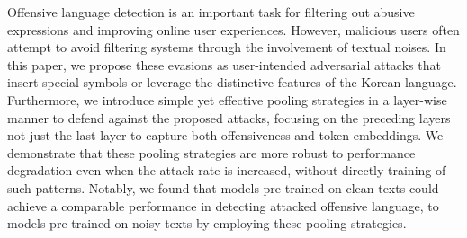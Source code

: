 Offensive language detection is an important task for filtering out abusive expressions and improving online user experiences. However, malicious users often attempt to avoid filtering systems through the involvement of textual noises. In this paper, we propose these evasions as user-intended adversarial attacks that insert special symbols or leverage the distinctive features of the Korean language. Furthermore, we introduce simple yet effective pooling strategies in a layer-wise manner to defend against the proposed attacks, focusing on the preceding layers not just the last layer to capture both offensiveness and token embeddings. We demonstrate that these pooling strategies are more robust to performance degradation even when the attack rate is increased, without directly training of such patterns. Notably, we found that models pre-trained on clean texts could achieve a comparable performance in detecting attacked offensive language, to models pre-trained on noisy texts by employing these pooling strategies.